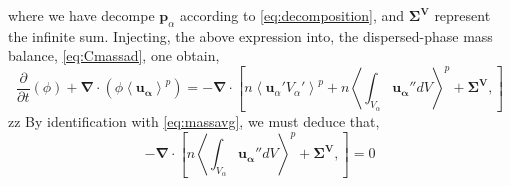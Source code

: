 where we have decompe $\bm{p}_\alpha$ according to \ref{eq:decomposition}, and $\bm{\Sigma^V}$ represent the infinite sum. 
Injecting, the above expression into, the dispersed-phase mass balance, \ref{eq:Cmassad}, one obtain,
\begin{equation}
    \frac{\partial }{\partial t}(\phi) 
    + \bm{\nabla}\cdot(\phi\left<\bm{u_\alpha}\right>^p )
    =  - \bm{\nabla}\cdot
    \left[
         n\left<\bm{u}_\alpha' V_\alpha'\right>^p
        + n\left<\int_{V_\alpha} \bm{u_\alpha''}dV\right>^p 
        + \bm{\Sigma^V},
    \right]
\end{equation}zz
By identification with \ref{eq:massavg}, we must deduce that, 
\begin{equation}
    - \bm{\nabla}\cdot
    \left[
         n\left<\int_{V_\alpha} \bm{u_\alpha''}dV\right>^p 
        + \bm{\Sigma^V},
    \right]
    = 0
\end{equation}

